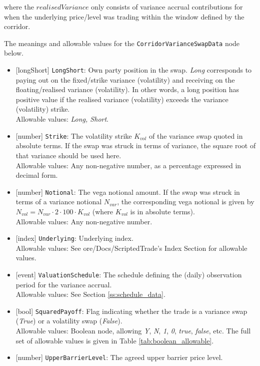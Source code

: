 where the $realisedVariance$ only consists of variance accrual contributions for when the underlying price/level
was trading within the window defined by the corridor.

The meanings and allowable values for the \lstinline!CorridorVarianceSwapData! node below.

\begin{itemize}
  \item{}[longShort] \lstinline!LongShort!: Own party position in the swap. \emph{Long} corresponds to paying out on the
  fixed/strike variance (volatility) and receiving on the floating/realised variance (volatility). In other words,
  a long position has positive value if the realised variance (volatility) exceeds the variance (volatility)
  strike. \\
  Allowable values: \emph{Long, Short}.
  \item{}[number] \lstinline!Strike!: The volatility strike $K_{vol}$ of the variance swap quoted in absolute terms.
  If the swap was struck in terms of variance, the square root of that variance should be used here. \\
  Allowable values: Any non-negative number, as a percentage expressed in decimal form.
  \item{}[number] \lstinline!Notional!: The vega notional amount. If the swap was struck in terms of a variance notional
  $N_{var}$, the corresponding vega notional is given by $N_{vol} = N_{var} \cdot 2 \cdot 100 \cdot K_{vol}$ (where
  $K_{vol}$ is in absolute terms). \\
  Allowable values: Any non-negative number.
  \item{}[index] \lstinline!Underlying!: Underlying index. \\
  Allowable values: See ore/Docs/ScriptedTrade's Index Section for allowable values.
  \item{}[event] \lstinline!ValuationSchedule!: The schedule defining the (daily) observation period for the variance accrual. \\
  Allowable values: See Section \ref{ss:schedule_data}.
  \item{}[bool] \lstinline!SquaredPayoff!: Flag indicating whether the trade is a variance swap (\emph{True}) or a volatility
  swap (\emph{False}). \\
  Allowable values: Boolean node, allowing \emph{Y}, \emph{N}, \emph{1}, \emph{0}, \emph{true}, \emph{false}, etc.
  The full set of allowable values is given in Table \ref{tab:boolean_allowable}.
  \item{}[number] \lstinline!UpperBarrierLevel!: The agreed upper barrier price level. \\

\end{itemize}
